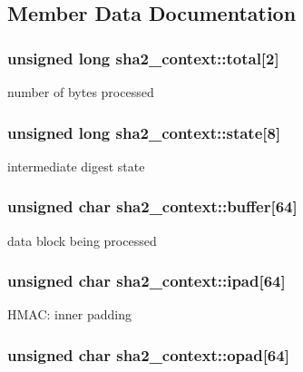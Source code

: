 \subsection{Member Data Documentation}
\hypertarget{structsha2__context_a485843c955ab26a3d78d499934371df1}{
\subsubsection[{total}]{\setlength{\rightskip}{0pt plus 5cm}unsigned long sha2\+\_\+context\+::total\mbox{[}2\mbox{]}}}\label{structsha2__context_a485843c955ab26a3d78d499934371df1}
number of bytes processed \hypertarget{structsha2__context_a61a62a66ac1851bcd90aa65e7fad1328}{
\subsubsection[{state}]{\setlength{\rightskip}{0pt plus 5cm}unsigned long sha2\+\_\+context\+::state\mbox{[}8\mbox{]}}}\label{structsha2__context_a61a62a66ac1851bcd90aa65e7fad1328}
intermediate digest state \hypertarget{structsha2__context_aa5c93c2e2e8fc23008a849ea4f9a0b91}{
\subsubsection[{buffer}]{\setlength{\rightskip}{0pt plus 5cm}unsigned char sha2\+\_\+context\+::buffer\mbox{[}64\mbox{]}}}\label{structsha2__context_aa5c93c2e2e8fc23008a849ea4f9a0b91}
data block being processed \hypertarget{structsha2__context_a4b003f9de8a8d823d19e813311764bd2}{
\subsubsection[{ipad}]{\setlength{\rightskip}{0pt plus 5cm}unsigned char sha2\+\_\+context\+::ipad\mbox{[}64\mbox{]}}}\label{structsha2__context_a4b003f9de8a8d823d19e813311764bd2}
H\+M\+A\+C\+: inner padding \hypertarget{structsha2__context_a3f710fbbb4c2c1ce3d57de40b1036cea}{
\subsubsection[{opad}]{\setlength{\rightskip}{0pt plus 5cm}unsigned char sha2\+\_\+context\+::opad\mbox{[}64\mbox{]}}}\label{structsha2__context_a3f710fbbb4c2c1ce3d57de40b1036cea}
